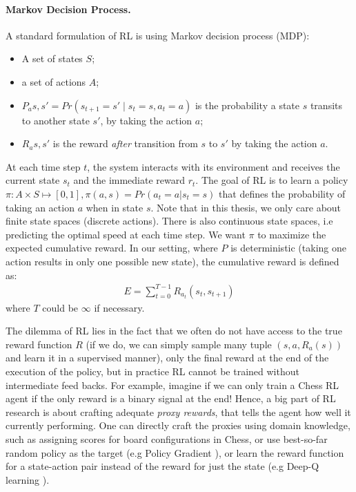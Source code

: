 \paragraph{Markov Decision Process.} A standard formulation of RL is using
Markov decision process (MDP):
\begin{itemize}
  \item A set of states $S$;
  \item a set of actions $A$;
  \item $P_a{s, s'} = Pr(s_{t+1} = s' \mid s_t = s, a_t = a)$ is the probability
    a state $s$ transits to another state $s'$, by taking the action $a$;
  \item $R_a{s, s'}$ is the reward \emph{after} transition from $s$ to $s'$ by
    taking the action $a$.  
\end{itemize}
At each time step $t$, the system interacts with its environment and receives
the current state $s_t$ and the immediate reward $r_t$. The goal of RL is to
learn a policy $\pi: A \times S \mapsto [0, 1], \pi(a, s) = Pr(a_t=a|s_t=s)$
that defines the probability of taking an action $a$ when in state $s$. Note
that in this thesis, we only care about finite state spaces (discrete actions).
There is also continuous state spaces, i.e predicting the
optimal speed at each time step. We want $\pi$ to maximize the expected
cumulative reward. In our setting, where $P$ is deterministic (taking one action
results in only one possible new state), the cumulative
reward is defined as:
\begin{align}
  E = \sum_{t=0}^{T-1}{R_{a_t}(s_t, s_{t+1})}
\end{align}
where $T$ could be $\infty$ if necessary.

The dilemma of RL lies in the fact that we often do not have access to the true
reward function $R$ (if we do, we can simply sample many tuple $(s, a,
R_a(s))$ and learn it in a supervised manner), only the final reward at the
end of the execution of the policy, but in practice RL cannot be trained without
intermediate feed backs. For example, imagine if we can only train a Chess RL agent if the
only reward is a binary signal at the end! Hence, a big part of RL research is
about crafting adequate \emph{proxy rewards}, that tells the agent how well
it currently performing. One can directly craft the proxies using domain
knowledge, such as assigning scores for board configurations in Chess, or use
best-so-far random policy as the target (e.g Policy Gradient \cite{reinforce}), or learn the reward
function for a state-action pair instead of the reward for just the state
(e.g Deep-Q learning \cite{deepq}).